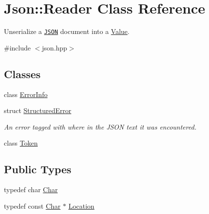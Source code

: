 \hypertarget{classJson_1_1Reader}{}\section{Json\+:\+:Reader Class Reference}
\label{classJson_1_1Reader}


Unserialize a \href{http://www.json.org}{\tt J\+S\+ON} document into a \hyperlink{classJson_1_1Value}{Value}.  




{\ttfamily \#include $<$json.\+hpp$>$}

\subsection*{Classes}
\begin{DoxyCompactItemize}
\item 
class \hyperlink{classJson_1_1Reader_1_1ErrorInfo}{Error\+Info}
\item 
struct \hyperlink{structJson_1_1Reader_1_1StructuredError}{Structured\+Error}
\begin{DoxyCompactList}\small\item\em An error tagged with where in the J\+S\+ON text it was encountered. \end{DoxyCompactList}\item 
class \hyperlink{classJson_1_1Reader_1_1Token}{Token}
\end{DoxyCompactItemize}
\subsection*{Public Types}
\begin{DoxyCompactItemize}
\item 
typedef char \hyperlink{classJson_1_1Reader_a3eec9118f3e9a672ba8348c3a79d0f45}{Char}
\item 
typedef const \hyperlink{classJson_1_1Reader_a3eec9118f3e9a672ba8348c3a79d0f45}{Char} $\ast$ \hyperlink{classJson_1_1Reader_a46795b5b272bf79a7730e406cb96375a}{Location}
\end{DoxyCompactItemize}

